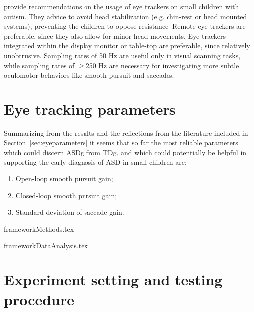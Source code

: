 \cite{sasson2012children} provide recommendations on the usage of eye trackers on small children with autism. They advice to avoid head stabilization (e.g. chin-rest or head mounted systems), preventing the children to oppose resistance. Remote eye trackers are preferable, since they also allow for minor head movements. Eye trackers integrated within the display monitor or table-top are preferable, since relatively unobtrusive. Sampling rates of 50 Hz are useful only in visual scanning tasks, while sampling rates of \(\geq\)250 Hz are necessary for investigating more subtle oculomotor behaviors like smooth pursuit and saccades. 

\section{Eye tracking parameters}
\label{sec:fwkparameters}

Summarizing from the results and the reflections from the literature included in Section~\ref{sec:eyeparameters} it seems that so far the most reliable parameters which could discern ASDg from TDg, and which could potentially be helpful in supporting the early diagnosis of ASD in small children are:
\begin{enumerate}
    \item Open-loop smooth pursuit gain;
    \item Closed-loop smooth pursuit gain;
    \item Standard deviation of saccade gain.
\end{enumerate}


{frameworkMethods.tex}

{frameworkDataAnalysis.tex}



\section{Experiment setting and testing procedure}
\label{sec:fwksettingprocedure}

